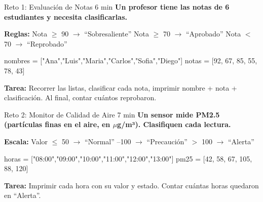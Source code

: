 \documentclass[aspectratio=169, 11pt]{beamer}
\begin{document}
\begin{frame}[fragile,shrink=30]{Reto 1: Evaluación de Notas \hfill {\normalsize\color{arcaRed}\faClock\hspace{4pt}6 min}}
  \vspace{-6pt}
  {\small\color{arcaDark}\bfseries
    Un profesor tiene las notas de 6 estudiantes y necesita clasificarlas.}

  \vspace{5pt}
  {\footnotesize\color{textMuted}
    \textbf{Reglas:}
    Nota $\geq$ 90 $\rightarrow$ ``Sobresaliente'' \quad
    Nota $\geq$ 70 $\rightarrow$ ``Aprobado'' \quad
    Nota $<$ 70 $\rightarrow$ ``Reprobado''
  }

  \vspace{4pt}
  \begin{pyblock}
nombres = ["Ana","Luis","Maria","Carlos","Sofia","Diego"]
notas   = [92, 67, 85, 55, 78, 43]
  \end{pyblock}

  \vspace{3pt}
  {\footnotesize\color{textMuted}
    \textbf{Tarea:} Recorrer las listas, clasificar cada nota,
    imprimir nombre + nota + clasificación.
    Al final, contar cuántos reprobaron.
  }
\end{frame}

\begin{frame}[fragile,shrink=30]{Reto 2: Monitor de Calidad de Aire \hfill {\normalsize\color{arcaRed}\faClock\hspace{4pt}7 min}}
  \vspace{-6pt}
  {\small\color{arcaDark}\bfseries
    Un sensor mide PM2.5 (partículas finas en el aire, en $\mu$g/m³).
    Clasifiquen cada lectura.}

  \vspace{4pt}
  {\footnotesize\color{textMuted}
    \textbf{Escala:}
    Valor $\leq$ 50 $\rightarrow$ ``Normal'' --100 $\rightarrow$ ``Precaución'' \quad
    $>$ 100 $\rightarrow$ ``Alerta''
  }

  \vspace{4pt}
  \begin{pyblock}
horas = ["08:00","09:00","10:00","11:00","12:00","13:00"]
pm25  = [42, 58, 67, 105, 88, 120]
  \end{pyblock}

  \vspace{3pt}
  {\footnotesize\color{textMuted}
    \textbf{Tarea:} Imprimir cada hora con su valor y estado.
    Contar cuántas horas quedaron en ``Alerta''.
  }
\end{frame}
\end{document}
